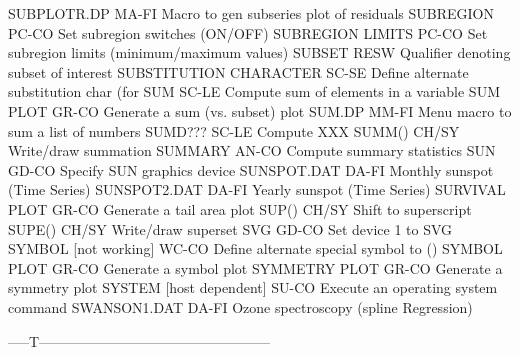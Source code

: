 SUBPLOTR.DP                 MA-FI Macro to gen subseries plot of residuals
SUBREGION                   PC-CO Set subregion switches (ON/OFF)
SUBREGION LIMITS            PC-CO Set subregion limits (minimum/maximum values)
SUBSET                      RESW  Qualifier denoting subset of interest
SUBSTITUTION CHARACTER      SC-SE Define alternate substitution char (for \)
SUM                         SC-LE Compute sum of elements in a variable
SUM PLOT                    GR-CO Generate a sum (vs. subset) plot
SUM.DP                      MM-FI Menu macro to sum a list of numbers
SUMD???                     SC-LE Compute XXX
SUMM()                      CH/SY Write/draw summation
SUMMARY                     AN-CO Compute summary statistics
SUN                         GD-CO Specify SUN graphics device
SUNSPOT.DAT                 DA-FI Monthly sunspot (Time Series)
SUNSPOT2.DAT                DA-FI Yearly sunspot (Time Series)
SURVIVAL PLOT               GR-CO Generate a tail area plot
SUP()                       CH/SY Shift to superscript
SUPE()                      CH/SY Write/draw superset
SVG                         GD-CO Set device 1 to SVG
SYMBOL [not working]        WC-CO Define alternate special symbol to ()
SYMBOL PLOT                 GR-CO Generate a symbol plot
SYMMETRY PLOT               GR-CO Generate a symmetry plot
SYSTEM [host dependent]     SU-CO Execute an operating system command
SWANSON1.DAT                DA-FI Ozone spectroscopy (spline Regression)

-----T--------------------------------------------------


